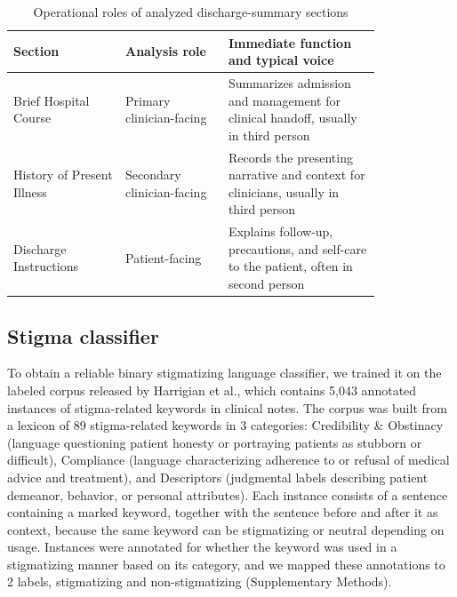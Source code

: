 \documentclass[unnumsec,webpdf,contemporary,large]{oup-authoring-template}
\begin{document}
\begin{table}[!t]
\caption{Operational roles of analyzed discharge-summary sections}
\label{tab:sections}
\centering
\begin{tabular}{p{0.25\linewidth}p{0.23\linewidth}p{0.34\linewidth}}
\toprule
Section & Analysis role & Immediate function and typical voice \\
\midrule
Brief Hospital Course & Primary clinician-facing & Summarizes admission and management for clinical handoff, usually in third person \\
History of Present Illness & Secondary clinician-facing & Records the presenting narrative and context for clinicians, usually in third person \\
Discharge Instructions & Patient-facing & Explains follow-up, precautions, and self-care to the patient, often in second person \\
\bottomrule
\end{tabular}
\end{table}

\subsection{Stigma classifier}
To obtain a reliable binary stigmatizing language classifier, we trained it on the labeled corpus released by Harrigian et al.,\cite{harrigian2023} which contains 5,043 annotated instances of stigma-related keywords in clinical notes. The corpus was built from a lexicon of 89 stigma-related keywords in 3 categories: Credibility \& Obstinacy (language questioning patient honesty or portraying patients as stubborn or difficult), Compliance (language characterizing adherence to or refusal of medical advice and treatment), and Descriptors (judgmental labels describing patient demeanor, behavior, or personal attributes). Each instance consists of a sentence containing a marked keyword, together with the sentence before and after it as context, because the same keyword can be stigmatizing or neutral depending on usage. Instances were annotated for whether the keyword was used in a stigmatizing manner based on its category, and we mapped these annotations to 2 labels, stigmatizing and non-stigmatizing (Supplementary Methods).
\end{document}
